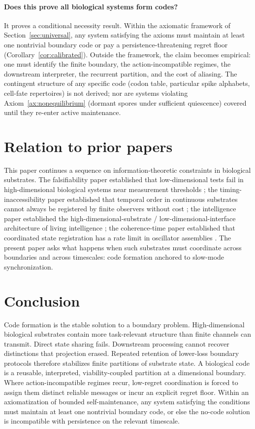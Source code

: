 \documentclass[12pt]{article}
\theoremstyle{definition}
\begin{document}
\paragraph{Does this prove all biological systems form codes?} It proves a conditional necessity result. Within the axiomatic framework of Section~\ref{sec:universal}, any system satisfying the axioms must maintain at least one nontrivial boundary code or pay a persistence-threatening regret floor (Corollary~\ref{cor:calibrated}). Outside the framework, the claim becomes empirical: one must identify the finite boundary, the action-incompatible regimes, the downstream interpreter, the recurrent partition, and the cost of aliasing. The contingent structure of any specific code (codon table, particular spike alphabets, cell-fate repertoires) is not derived; nor are systems violating Axiom~\ref{ax:nonequilibrium} (dormant spores under sufficient quiescence) covered until they re-enter active maintenance.

\section{Relation to prior papers}
\label{sec:prior}

This paper continues a sequence on information-theoretic constraints in biological substrates. The falsifiability paper established that low-dimensional tests fail in high-dimensional biological systems near measurement thresholds \citep{todd2025falsifiability}; the timing-inaccessibility paper established that temporal order in continuous substrates cannot always be registered by finite observers without cost \citep{todd2025maxwell}; the intelligence paper established the high-dimensional-substrate / low-dimensional-interface architecture of living intelligence \citep{todd2026a_intelligence}; the coherence-time paper established that coordinated state registration has a rate limit in oscillator assemblies \citep{todd2026b_coherencetime}. The present paper asks what happens when such substrates must coordinate across boundaries and across timescales: code formation anchored to slow-mode synchronization.

\section{Conclusion}
\label{sec:conclusion}

Code formation is the stable solution to a boundary problem. High-dimensional biological substrates contain more task-relevant structure than finite channels can transmit. Direct state sharing fails. Downstream processing cannot recover distinctions that projection erased. Repeated retention of lower-loss boundary protocols therefore stabilizes finite partitions of substrate state. A biological code is a reusable, interpreted, viability-coupled partition at a dimensional boundary. Where action-incompatible regimes recur, low-regret coordination is forced to assign them distinct reliable messages or incur an explicit regret floor. Within an axiomatization of bounded self-maintenance, any system satisfying the conditions must maintain at least one nontrivial boundary code, or else the no-code solution is incompatible with persistence on the relevant timescale.
\end{document}

